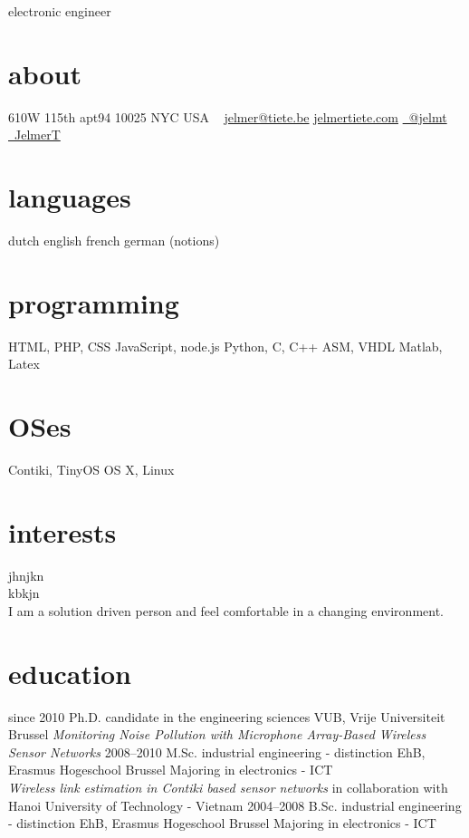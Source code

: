 \documentclass[print]{friggeri-cv}
\begin{document}
       {electronic engineer}


\begin{aside}
  \section{about}
    610W 115th apt94
    10025 NYC
    USA
    ~
    \href{mailto:jelmer@tiete.be}{jelmer@tiete.be}
    \href{http://jelmertiete.com}{jelmertiete.com}
    \href{http://twitter.com/jelmt}{\faTwitter~@jelmt}
    \href{https://github.com/JelmerT}{\faGithub~JelmerT}
  \section{languages}
    dutch
    english
    french
    german (notions)
  \section{programming}
    HTML, PHP, CSS
    JavaScript, node.js
    Python, C, C++
    ASM, VHDL
    Matlab, Latex
  \section{OSes}
    Contiki, TinyOS
    OS X, Linux
\end{aside}

\section{interests}
jhnjkn\\
kbkjn \\
I am a solution driven person and feel comfortable in a changing environment.

\section{education}

\begin{entrylist}
  \entry
    {since 2010}
    {Ph.D. {\normalfont candidate in the engineering sciences}}
    {VUB, Vrije Universiteit Brussel}
    {\emph{Monitoring Noise Pollution with Microphone Array-Based Wireless Sensor Networks}}
  \entry
    {2008–2010}
    {M.Sc. {\normalfont industrial engineering - distinction}}
    {EhB, Erasmus Hogeschool Brussel}
    {Majoring in electronics - ICT\\
    \emph{Wireless link estimation in Contiki based sensor networks} in collaboration with Hanoi University of Technology - Vietnam}
  \entry
    {2004–2008}
    {B.Sc. {\normalfont industrial engineering - distinction}}
    {EhB, Erasmus Hogeschool Brussel}
    {Majoring in electronics - ICT}
\end{entrylist}
\end{document}
